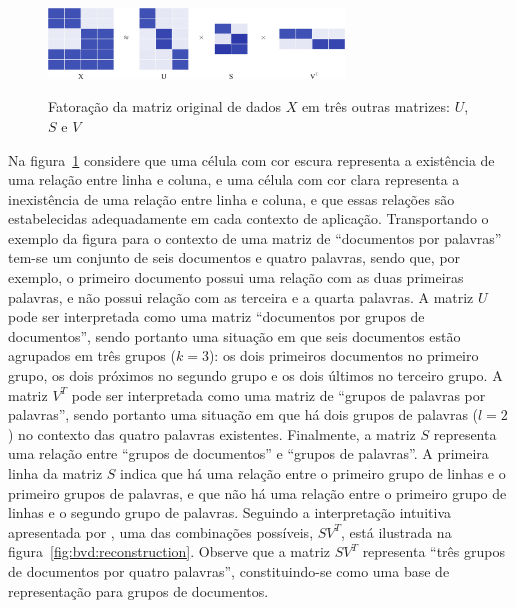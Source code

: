 \documentclass[
    12pt,                %
    oneside,            %
    a4paper,            %
    english,            %
    brazil                %
    ]{abntex2ppgsi}
\begin{document}

\begin{figure}[H]
\centering
\caption{
Fatoração da matriz original de dados $X$ em três outras matrizes: $U$, $S$ e $V$}
\includegraphics[width=0.7\textwidth]{img/factorizationXUSV.png}
\label{fig:bvd}
\end{figure}

Na figura~\ref{fig:bvd} considere que uma célula com cor escura representa a existência de uma relação entre linha e coluna, e uma célula com cor clara representa a inexistência de uma relação entre linha e coluna, e que essas relações são estabelecidas adequadamente em cada contexto de aplicação.
Transportando o exemplo da figura para o contexto de uma matriz de ``documentos por palavras'' tem-se um conjunto de seis documentos e quatro palavras, sendo que, por exemplo, o primeiro documento possui uma relação com as duas primeiras palavras, e não possui relação com as terceira e a quarta palavras.
A matriz $U$ pode ser interpretada como uma matriz ``documentos por grupos de documentos'', sendo portanto uma situação em que seis documentos estão agrupados em três grupos ($k = 3$): os dois primeiros documentos no primeiro grupo, os dois próximos no segundo grupo e os dois últimos no terceiro grupo.
A matriz $V^T$ pode ser interpretada como uma matriz de ``grupos de palavras por palavras'', sendo portanto uma situação em que há dois grupos de palavras ($l = 2$) no contexto das quatro palavras existentes.
Finalmente, a matriz $S$ representa uma relação entre ``grupos de documentos'' e ``grupos de palavras''.
A primeira linha da matriz $S$ indica que há uma relação entre o primeiro grupo de linhas e o primeiro grupos de palavras, e que não há uma relação entre o primeiro grupo de linhas e o segundo grupo de palavras.
Seguindo a interpretação intuitiva apresentada por \cite{Long2005}, uma das combinações possíveis, $SV^T$, está ilustrada na figura~\ref{fig:bvd:reconstruction}.
Observe que a matriz $SV^T$ representa ``três grupos de documentos por quatro palavras'', constituindo-se como uma base de representação para grupos de documentos.
\end{document}
